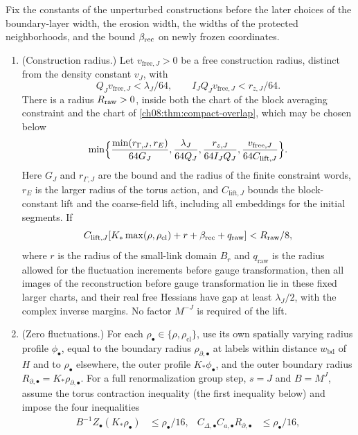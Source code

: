 \begin{lemma}\label{ch16:lem:strict-two-radius-images}
Fix the constants of the unperturbed constructions before the later choices of the boundary-layer width, the erosion width, the widths of the protected neighborhoods, and the bound $\beta_{\mathrm{rec}}$ on newly frozen coordinates.
\begin{enumerate}
\item (Construction radius.) Let $v_{\mathrm{free},J}>0$ be a free construction radius, distinct from the density constant $v_J$, with
\[
 Q_Jv_{\mathrm{free},J}<\lambda_J/64,
 \qquad I_JQ_Jv_{\mathrm{free},J}<r_{z,J}/64.
\]
There is a radius $R_{\mathrm{raw}}>0$, inside both the chart of the block averaging constraint and the chart of \cref{ch08:thm:compact-overlap}, which may be chosen below
\[
 \min\Bigl\{\frac{\min(r_{\Gamma,J},r_E)}{64G_J},
 \frac{\lambda_J}{64Q_J},\frac{r_{z,J}}{64I_JQ_J},
 \frac{v_{\mathrm{free},J}}{64C_{\mathrm{lift},J}}\Bigr\}.
\]
Here $G_J$ and $r_{\Gamma,J}$ are the bound and the radius of the finite constraint words, $r_E$ is the larger radius of the torus action, and $C_{\mathrm{lift},J}$ bounds the block-constant lift and the coarse-field lift, including all embeddings for the initial segments. If
\[
 C_{\mathrm{lift},J}
 [K_*\max(\rho,\rho_{\mathrm{cl}})+r+\beta_{\mathrm{rec}}+q_{\mathrm{raw}}]
                                                <R_{\mathrm{raw}}/8,
\]
where $r$ is the radius of the small-link domain $B_r$ and $q_{\mathrm{raw}}$ is the radius allowed for the fluctuation increments before gauge transformation, then all images of the reconstruction before gauge transformation lie in these fixed larger charts, and their real free Hessians have gap at least $\lambda_J/2$, with the complex inverse margins. No factor $M^{-J}$ is required of the lift.
\item (Zero fluctuations.) For each $\rho_\bullet\in\{\rho,\rho_{\mathrm{cl}}\}$, use its own spatially varying radius profile $\phi_\bullet$, equal to the boundary radius $\rho_{\partial,\bullet}$ at labels within distance $w_{\mathrm{bd}}$ of $H$ and to $\rho_\bullet$ elsewhere, the outer profile $K_*\phi_\bullet$, and the outer boundary radius $R_{\partial,\bullet}=K_*\rho_{\partial,\bullet}$. For a full renormalization group step, $s=J$ and $B=M^J$, assume the torus contraction inequality (the first inequality below) and impose the four inequalities
\[
 \begin{aligned}
 B^{-1}Z_\bullet(K_*\rho_\bullet)&\le\rho_\bullet/16,&
 C_{\Delta,\bullet}C_{a,\bullet}R_{\partial,\bullet}
                                      &\le\rho_\bullet/16,\\

\end{aligned}\]
\end{enumerate}
\end{lemma}
